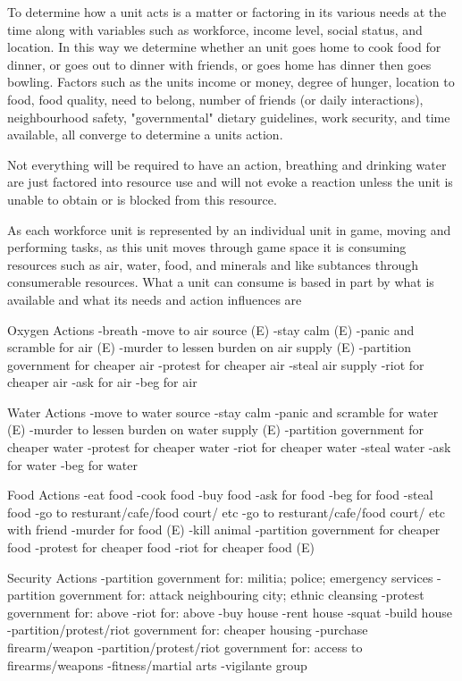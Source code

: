 To determine how a unit acts is a matter or factoring in its various needs at the time along with variables such as workforce, income level, social status, and location. In this way we determine whether an unit goes home to cook food for dinner, or goes out to dinner with friends, or goes home has dinner then goes bowling. Factors such as the units income or money, degree of hunger, location to food, food quality, need to belong, number of friends (or daily interactions), neighbourhood safety, "governmental" dietary guidelines, work security, and time available, all converge to determine a units action. 

Not everything will be required to have an action, breathing and drinking water are just factored into resource use and will not evoke a reaction unless the unit is unable to obtain or is blocked from this resource.

As each workforce unit is represented by an individual unit in game, moving and performing tasks, as this unit moves through game space it is consuming resources such as air, water, food, and minerals and like subtances through consumerable resources. What a unit can consume is based in part by what is available and what its needs and action influences are

Oxygen Actions
-breath 
-move to air source (E)
-stay calm (E)
-panic and scramble for air (E)
-murder to lessen burden on air supply (E)
-partition government for cheaper air
-protest for cheaper air
-steal air supply
-riot for cheaper air
-ask for air
-beg for air

Water Actions
-move to water source
-stay calm
-panic and scramble for water (E)
-murder to lessen burden on water supply (E)
-partition government for cheaper water
-protest for cheaper water
-riot for cheaper water
-steal water
-ask for water
-beg for water


Food Actions
-eat food
-cook food
-buy food
-ask for food
-beg for food
-steal food 
-go to resturant/cafe/food court/ etc
-go to resturant/cafe/food court/ etc with friend
-murder for food (E)
-kill animal
-partition government for cheaper food
-protest for cheaper food
-riot for cheaper food (E)


Security Actions
-partition government for: militia; police; emergency services
-partition government for: attack neighbouring city; ethnic cleansing
-protest government for: above
-riot for: above
-buy house
-rent house
-squat
-build house
-partition/protest/riot government for: cheaper housing
-purchase firearm/weapon
-partition/protest/riot government for: access to firearms/weapons
-fitness/martial arts
-vigilante group


